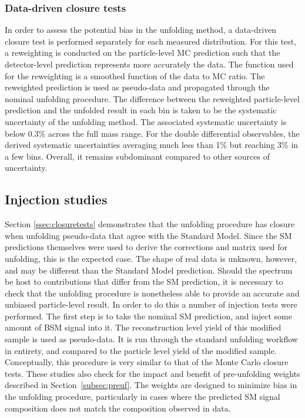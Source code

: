 \subsubsection{Data-driven closure tests}
\label{sssec:datadrivenclosure}
In order to assess the potential bias in the unfolding method, a data-driven closure test is performed separately for each measured distribution. For this test, a reweighting is conducted on the particle-level MC prediction such that the detector-level prediction represents more accurately the data. The function used for the reweighting is a smoothed function of the data to MC ratio. The reweighted prediction is used as pseudo-data and propagated through the nominal unfolding procedure. The difference between the reweighted particle-level prediction and the unfolded result in each bin is taken to be the systematic uncertainty of the unfolding method. The associated systematic uncertainty is below 0.3\% across the full mass range. For the double differential observables, the derived systematic uncertainties averaging much less than 1\% but reaching 3\% in a few bins. Overall, it remains subdominant compared to other sources of uncertainty.

\subsection{Injection studies}
\label{ssec:injectiontests}
Section \ref{ssec:closuretests} demonstrates that the unfolding procedure has closure when unfolding pseudo-data that agree with the Standard Model. Since the SM predictions themselves were used to derive the corrections and matrix used for unfolding, this is the expected case. The shape of real data is unknown, however, and may be different than the Standard Model prediction. Should the \mFourL{} spectrum be host to contributions that differ from the SM prediction, it is necessary to check that the unfolding procedure is nonetheless able to provide an accurate and unbiased particle-level result. In order to do this a number of injection tests were performed. The first step is to take the nominal SM prediction, and inject some amount of BSM signal into it. The reconstruction level yield of this modified sample is used as pseudo-data. It is run through the standard unfolding workflow in entirety, and compared to the particle level yield of the modified sample. Conceptually, this procedure is very similar to that of the Monte Carlo closure tests. These studies also check for the impact and benefit of pre-unfolding weights described in Section~\ref{subsec:preuf}. The weights are designed to minimize bias in the unfolding procedure, particularly in cases where the predicted SM signal composition does not match the composition observed in data.

